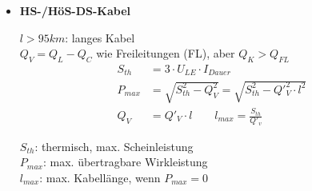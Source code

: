 \begin{itemize}
\item[] \textbf{HS-/HöS-DS-Kabel}

    $l>95km$: langes Kabel\\
    $Q_V = Q_L - Q_C$ wie Freileitungen (FL), aber $Q_K > Q_{FL}$
    \begin{align*}
        S_{th}&= 3\cdot U_{LE}\cdot I_{Dauer}\\
        P_{max}&= \sqrt{S^2_{th}-Q^2_V} = \sqrt{S^2_{th} - Q'^2_V \cdot l^2}\\
        Q_V &= Q'_V \cdot l \qquad l_{max}= \frac{S_{th}}{Q'_v}
    \end{align*}

    $S_{th}$: thermisch, max. Scheinleistung\\
    $P_{max}$: max. übertragbare Wirkleistung\\
    $l_{max}$: max. Kabellänge, wenn $P_{max} = 0$

\end{itemize}
